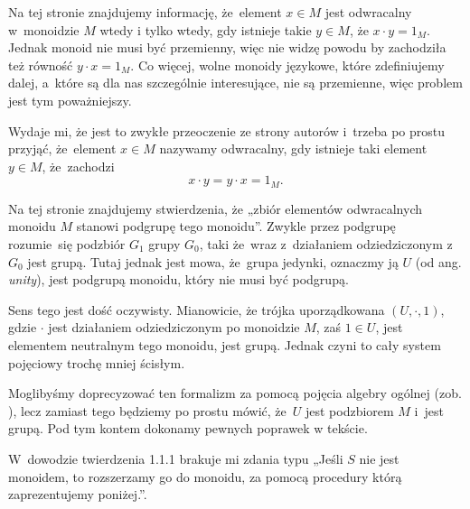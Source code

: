 \documentclass[a4paper,11pt]{article}
\begin{document}
\vspace{\spaceFour}



\start {} Na tej stronie znajdujemy informację, że~element
$x \in M$ jest odwracalny w~monoidzie $M$ wtedy i tylko wtedy, gdy
istnieje takie $y \in M$, że $x \cdot y = 1_{ M }$. Jednak monoid nie
musi być przemienny, więc nie widzę powodu by zachodziła też równość
$y \cdot x = 1_{ M }$. Co więcej, wolne monoidy językowe, które zdefiniujemy
dalej, a~które są dla nas szczególnie interesujące, nie są przemienne, więc problem jest tym poważniejszy.

Wydaje mi, że jest to zwykłe przeoczenie ze strony autorów i~trzeba po
prostu przyjąć, że~element $x \in M$ nazywamy odwracalny, gdy istnieje
taki element $y \in M$, że~zachodzi
\begin{equation}
  \label{eq:Forys-Forys-01}
  x \cdot y = y \cdot x = 1_{ M }.
\end{equation}

\vspace{\spaceFour}



\start {} Na tej stronie znajdujemy stwierdzenia, że „zbiór elementów
odwracalnych monoidu $M$ stanowi podgrupę tego monoidu”. Zwykle przez
podgrupę rozumie~się podzbiór $G_{ 1 }$ grupy $G_{ 0 }$, taki że~wraz
z~działaniem odziedziczonym z~$G_{ 0 }$ jest grupą. Tutaj jednak jest mowa,
że~grupa jedynki, oznaczmy ją $U$ (od ang. \textit{unity}), jest podgrupą
monoidu, który nie musi być podgrupą.

Sens tego jest dość oczywisty. Mianowicie, że trójka uporządkowana
$( U, \cdot, 1 )$, gdzie $\cdot$ jest działaniem odziedziczonym po monoidzie $M$,
zaś $1 \in U$, jest elementem neutralnym tego monoidu, jest grupą. Jednak
czyni to cały system pojęciowy trochę mniej ścisłym.

Moglibyśmy doprecyzować ten formalizm za pomocą pojęcia algebry ogólnej
(zob. \cite{BialynickiBirulaZarysAlgebry1987}), lecz zamiast tego będziemy
po prostu mówić, że~$U$ jest podzbiorem $M$ i~jest grupą. Pod tym kontem
dokonamy pewnych poprawek w tekście.

\vspace{\spaceFour}



\start {} W~dowodzie twierdzenia 1.1.1 brakuje mi zdania typu
„Jeśli $S$ nie jest monoidem, to rozszerzamy go do monoidu, za pomocą
procedury którą zaprezentujemy poniżej.”.

\vspace{\spaceFour}
\end{document}
